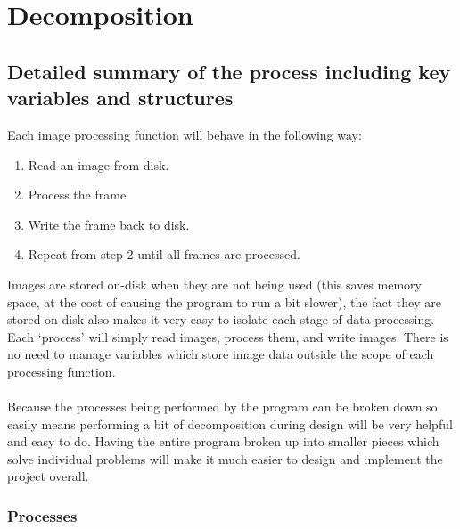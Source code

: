 \documentclass[11pt]{report}
\begin{document}
\section{Decomposition}
\subsection{Detailed summary of the process including key variables and structures}
Each image processing function will behave in the following way:
\begin{enumerate}
\item Read an image from disk.
\item Process the frame.
\item Write the frame back to disk.
\item Repeat from step 2 until all frames are processed.
\end{enumerate}
Images are stored on-disk when they are not being used (this saves memory space, at the cost of causing the program to run a bit slower), the fact they are stored on disk also makes it very easy to isolate each stage of data processing. Each `process' will simply read images, process them, and write images. There is no need to manage variables which store image data outside the scope of each processing function.\\\\
Because the processes being performed by the program can be broken down so easily means performing a bit of decomposition during design will be very helpful and easy to do. Having the entire program broken up into smaller pieces which solve individual problems will make it much easier to design and implement the project overall.

\subsubsection{Processes}
\end{document}
